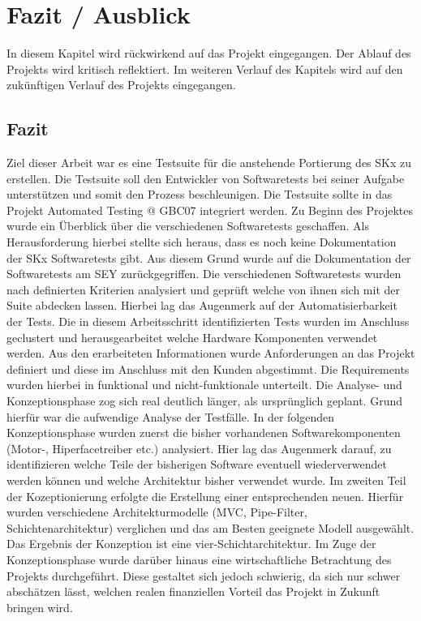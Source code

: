 \onehalfspacing
\section{Fazit / Ausblick}
In diesem Kapitel wird rückwirkend auf das Projekt eingegangen. Der Ablauf des Projekts wird kritisch reflektiert. Im weiteren Verlauf des Kapitels wird auf den zukünftigen Verlauf des Projekts eingegangen.
\subsection{Fazit}
Ziel dieser Arbeit war es eine Testsuite für die anstehende Portierung des SKx zu erstellen. Die Testsuite soll den Entwickler von Softwaretests bei seiner Aufgabe unterstützen und somit den Prozess beschleunigen. Die Testsuite sollte in das Projekt Automated Testing @ GBC07 integriert werden.
Zu Beginn des Projektes wurde ein Überblick über die verschiedenen Softwaretests geschaffen. Als Herausforderung hierbei stellte sich heraus, dass es noch keine Dokumentation der SKx Softwaretests gibt. Aus diesem Grund wurde auf die Dokumentation der Softwaretests am SEY zurückgegriffen. Die verschiedenen Softwaretests wurden nach definierten Kriterien analysiert und geprüft welche von ihnen sich mit der Suite abdecken lassen. Hierbei lag das Augenmerk auf der Automatisierbarkeit der Tests. Die in diesem Arbeitsschritt identifizierten Tests wurden im Anschluss geclustert und herausgearbeitet welche Hardware Komponenten verwendet werden. Aus den erarbeiteten Informationen wurde Anforderungen an das Projekt definiert und diese im Anschluss mit den Kunden abgestimmt. Die Requirements wurden hierbei in funktional und nicht-funktionale unterteilt. Die Analyse- und Konzeptionsphase zog sich real deutlich länger, als ursprünglich geplant. Grund hierfür war die aufwendige Analyse der Testfälle. In der folgenden Konzeptionsphase wurden zuerst die bisher vorhandenen Softwarekomponenten (Motor-, Hiperfacetreiber etc.) analysiert. Hier lag das Augenmerk darauf, zu identifizieren welche Teile der bisherigen Software eventuell wiederverwendet werden können und welche Architektur bisher verwendet wurde. Im zweiten Teil der Kozeptionierung erfolgte die Erstellung einer entsprechenden neuen. Hierfür wurden verschiedene Architekturmodelle (MVC, Pipe-Filter, Schichtenarchitektur) verglichen und das am Besten geeignete Modell ausgewählt. Das Ergebnis der Konzeption ist eine vier-Schichtarchitektur. Im Zuge der Konzeptionsphase wurde darüber hinaus eine wirtschaftliche Betrachtung des Projekts durchgeführt. Diese gestaltet sich jedoch schwierig, da sich nur schwer abschätzen lässt, welchen realen finanziellen Vorteil das Projekt in Zukunft bringen wird.
